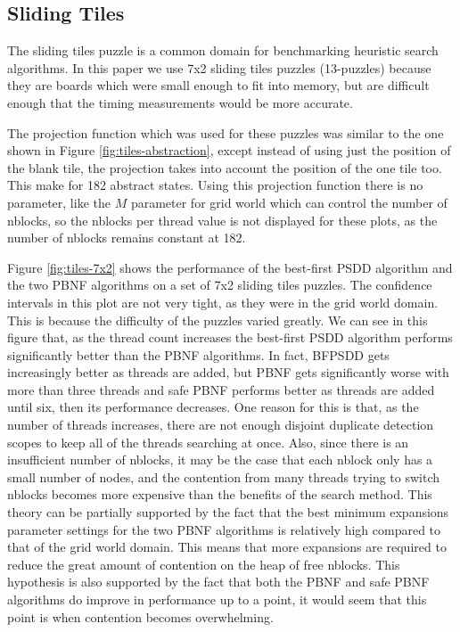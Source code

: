 \documentclass{article}
\begin{document}
\subsection{Sliding Tiles}

The sliding tiles puzzle is a common domain for benchmarking heuristic
search algorithms.  In this paper we use 7x2 sliding tiles puzzles
(13-puzzles) because they are boards which were small enough to fit
into memory, but are difficult enough that the timing measurements
would be more accurate.

The projection function which was used for these puzzles was similar
to the one shown in Figure \ref{fig:tiles-abstraction}, except instead
of using just the position of the blank tile, the projection takes
into account the position of the one tile too.  This make for 182
abstract states.  Using this projection function there is no
parameter, like the $M$ parameter for grid world which can control the
number of nblocks, so the nblocks per thread value is not displayed
for these plots, as the number of nblocks remains constant at 182.

Figure \ref{fig:tiles-7x2} shows the performance of the best-first
PSDD algorithm and the two PBNF algorithms on a set of 7x2 sliding
tiles puzzles.  The confidence intervals in this plot are not very
tight, as they were in the grid world domain.  This is because the
difficulty of the puzzles varied greatly.  We can see in this figure
that, as the thread count increases the best-first PSDD algorithm
performs significantly better than the PBNF algorithms.  In fact,
BFPSDD gets increasingly better as threads are added, but PBNF gets
significantly worse with more than three threads and safe PBNF
performs better as threads are added until six, then its performance
decreases.  One reason for this is that, as the number of threads
increases, there are not enough disjoint duplicate detection scopes to
keep all of the threads searching at once.  Also, since there is an
insufficient number of nblocks, it may be the case that each nblock
only has a small number of nodes, and the contention from many threads
trying to switch nblocks becomes more expensive than the benefits of
the search method.  This theory can be partially supported by the fact
that the best minimum expansions parameter settings for the two PBNF
algorithms is relatively high compared to that of the grid world
domain.  This means that more expansions are required to reduce the
great amount of contention on the heap of free nblocks.  This
hypothesis is also supported by the fact that both the PBNF and safe
PBNF algorithms do improve in performance up to a point, it would seem
that this point is when contention becomes overwhelming.
\end{document}
